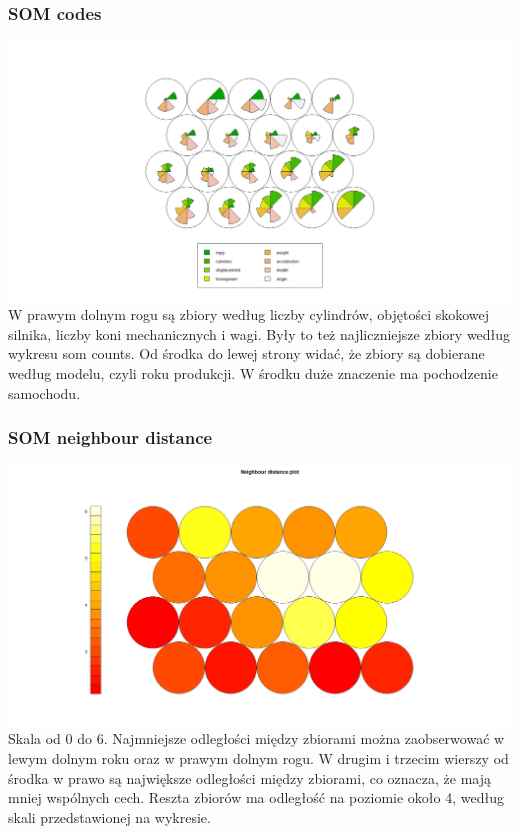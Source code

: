 \documentclass{article}
\begin{document}
        \subsubsection{SOM codes}   
            \includegraphics[width = \textwidth]{som_codes_fig.jpeg}
            W prawym dolnym rogu są zbiory według liczby cylindrów, objętości skokowej silnika, liczby koni mechanicznych i wagi. 
            Były to też najliczniejsze zbiory według wykresu som counts. Od środka do lewej strony widać, że zbiory są dobierane według 
            modelu, czyli roku produkcji. W środku duże znaczenie ma pochodzenie samochodu.

        \subsubsection{SOM neighbour distance}
            \includegraphics[width = \textwidth]{som_neighbour_dist_fig.jpeg}
            Skala od 0 do 6. Najmniejsze odległości między zbiorami można zaobserwować w lewym dolnym roku oraz w prawym dolnym rogu. 
            W drugim i trzecim wierszy od środka w prawo są największe odległości między zbiorami, co oznacza, że mają mniej wspólnych cech. 
            Reszta zbiorów ma odległość na poziomie około 4, według skali przedstawionej na wykresie. 
\end{document}
